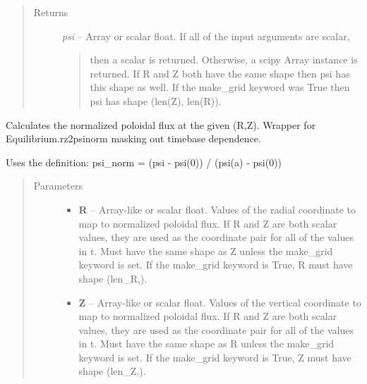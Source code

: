 \documentclass[letterpaper,10pt,english]{sphinxmanual}
\begin{document}
\begin{fulllineitems}
\begin{fulllineitems}
\begin{quote}
\begin{description}
\begin{itemize}
\end{itemize}

\item[{Returns}] \leavevmode

\emph{psi} --
Array or scalar float. If all of the input arguments are scalar,
\begin{quote}

then a scalar is returned. Otherwise, a scipy Array instance is
returned. If R and Z both have the same shape then psi has this
shape as well. If the make\_grid keyword was True then psi has
shape (len(Z), len(R)).
\end{quote}


\end{description}\end{quote}

\end{fulllineitems}


\begin{fulllineitems}
\label{eqtools:eqtools.eqdskreader.EqdskReader.rz2psinorm}
Calculates the normalized poloidal flux at the given (R,Z).
Wrapper for Equilibrium.rz2psinorm masking out timebase dependence.

Uses the definition:
psi\_norm = (psi - psi(0)) / (psi(a) - psi(0))
\begin{quote}\begin{description}
\item[{Parameters }] \leavevmode\begin{itemize}
\item {} 
\textbf{R} --
Array-like or scalar float.
Values of the radial coordinate to
map to normalized poloidal flux. If R and Z are both scalar
values, they are used as the coordinate pair for all of the
values in t. Must have the same shape as Z unless the make\_grid
keyword is set. If the make\_grid keyword is True, R must have
shape (len\_R,).

\item {} 
\textbf{Z} --
Array-like or scalar float.
Values of the vertical coordinate to
map to normalized poloidal flux. If R and Z are both scalar
values, they are used as the coordinate pair for all of the
values in t. Must have the same shape as R unless the make\_grid
keyword is set. If the make\_grid keyword is True, Z must have
shape (len\_Z,).


\end{itemize}
\end{description}
\end{quote}
\end{fulllineitems}
\end{fulllineitems}
\end{document}
